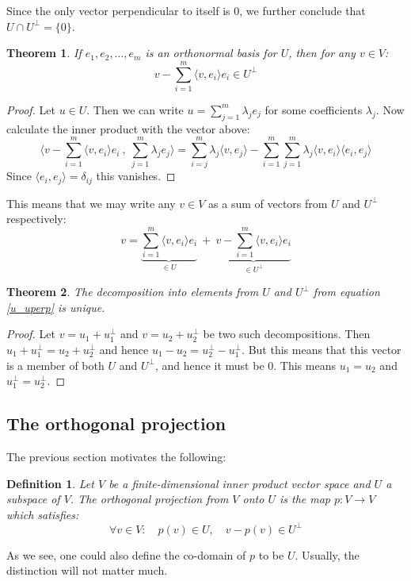 \documentclass[12pt, a4paper]{article}
\newtheorem{theorem}{Theorem}[section]
\newtheorem{definition}{Definition}[section]
\numberwithin{equation}{section}
\begin{document}
Since the only vector perpendicular to itself is $0$, we further conclude that $U\cap U^\perp=\{0\}$.

\begin{theorem}
If $e_1, e_2,\ldots,e_m$ is an orthonormal basis for $U$, then for any $v\in V$:
\begin{equation}
v-\sum_{i=1}^m\langle v,e_i\rangle e_i\in U^\perp
\end{equation}
\end{theorem}
\begin{proof}
Let $u\in U$. Then we can write $u=\sum_{j=1}^m\lambda_j e_j$ for some coefficients $\lambda_j$. Now calculate the inner product with the vector above:
\begin{equation}
\langle v-\sum_{i=1}^m\langle v,e_i\rangle e_i\ ,\ \sum_{j=1}^m\lambda_j e_j\rangle=\sum_{i=j}^m\lambda_j\langle v,e_j\rangle-\sum_{i=1}^m\sum_{j=1}^m\lambda_j\langle v,e_i\rangle\langle e_i,e_j\rangle
\end{equation}
Since $\langle e_i,e_j\rangle=\delta_{ij}$ this vanishes.
\end{proof}

This means that we may write any $v\in V$ as a sum of vectors from $U$ and $U^\perp$ respectively:
\begin{equation}
\label{u_uperp}
v=\underbrace{\sum_{i=1}^m\langle v,e_i\rangle e_i}_{\in U}\ +\ \underbrace{v-\sum_{i=1}^m\langle v,e_i\rangle e_i}_{\in U^\perp}
\end{equation}

\begin{theorem}
The decomposition into elements from $U$ and $U^\perp$ from equation \ref{u_uperp} is unique.
\end{theorem}
\begin{proof}
Let $v=u_1+u^\perp_1$ and $v=u_2+u^\perp_2$ be two such decompositions. Then $u_1+u^\perp_1=u_2+u^\perp_2$ and hence $u_1-u_2=u^\perp_2-u^\perp_1$. But this means that this vector is a member of both $U$ and $U^\perp$, and hence it must be $0$. This means $u_1=u_2$ and $u^\perp_1=u^\perp_2$.
\end{proof}

\subsection{The orthogonal projection}
The previous section motivates the following:
\begin{definition}
Let $V$ be a finite-dimensional inner product vector space and $U$ a subspace of $V$. The orthogonal projection from $V$ onto $U$ is the map $p:V\rightarrow V$ which satisfies:
\begin{equation}
\forall v\in V:\quad p(v)\in U,\quad v-p(v)\in U^\perp
\end{equation}
\end{definition}
As we see, one could also define the co-domain of $p$ to be $U$. Usually, the distinction will not matter much.
\end{document}
